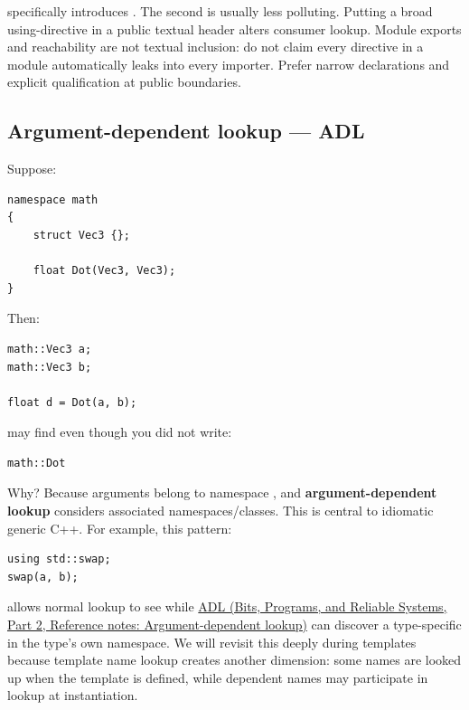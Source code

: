 specifically introduces . The second is usually less polluting. Putting a broad using-directive in a public textual header alters consumer lookup. Module exports and reachability are not textual inclusion: do not claim every directive in a module automatically leaks into every importer. Prefer narrow declarations and explicit qualification at public boundaries.

\subsection{Argument-dependent lookup --- ADL}\label{05-engine-i-ch002-argument-dependent-lookup-adl}

\hypertarget{05-engine-i-ch002-argument-dependent-lookup-adl}{}

Suppose:

\begin{verbatim}
namespace math
{
    struct Vec3 {};

    float Dot(Vec3, Vec3);
}
\end{verbatim}

Then:

\begin{verbatim}
math::Vec3 a;
math::Vec3 b;

float d = Dot(a, b);
\end{verbatim}

may find  even though you did not write:

\begin{verbatim}
math::Dot
\end{verbatim}

Why? Because arguments belong to namespace , and \textbf{argument-dependent lookup} considers associated namespaces/classes. This is central to idiomatic generic C++. For example, this pattern:

\begin{verbatim}
using std::swap;
swap(a, b);
\end{verbatim}

allows normal lookup to see  while \href{../01-Bits-Programs-and-Reliable-Systems-P02/main.pdf\#nameddest=appendix-7863714aa97f}{ADL (Bits, Programs, and Reliable Systems, Part 2, Reference notes: Argument-dependent lookup)} can discover a type-specific  in the type's own namespace. We will revisit this deeply during templates because template name lookup creates another dimension: some names are looked up when the template is defined, while dependent names may participate in lookup at instantiation.

